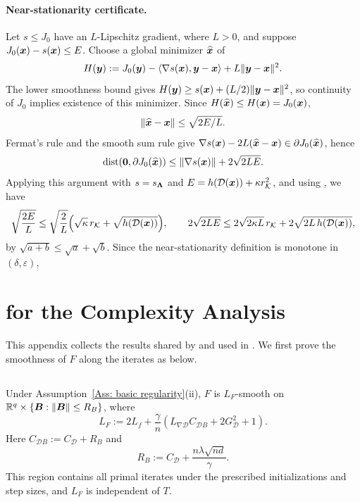 \paragraph{Near-stationarity certificate.}
Let $s\le J_0$ have an $L$-Lipschitz gradient, where $L>0$, and suppose $J_0(\bm{x})-s(\bm{x})\le E$. Choose a global minimizer $\widehat{\bm{x}}$ of
\[
H(\bm{y}):=J_0(\bm{y})-\langle\nabla s(\bm{x}),\bm{y}-\bm{x}\rangle+L\|\bm{y}-\bm{x}\|^2.
\]
The lower smoothness bound gives $H(\bm{y})\ge s(\bm{x})+(L/2)\|\bm{y}-\bm{x}\|^2$, so continuity of $J_0$ implies existence of this minimizer. Since $H(\widehat{\bm{x}})\le H(\bm{x})=J_0(\bm{x})$,
\[
\|\widehat{\bm{x}}-\bm{x}\|\le\sqrt{2E/L}.
\]
Fermat's rule and the smooth sum rule give
$\nabla s(\bm{x})-2L(\widehat{\bm{x}}-\bm{x})\in\partial J_0(\widehat{\bm{x}})$, hence
\[
\operatorname{dist}(\bm0,\partial J_0(\widehat{\bm{x}}))
\le\|\nabla s(\bm{x})\|+2\sqrt{2LE}.
\]
Applying this argument with $s=s_{\bm{\Lambda}}$ and $E=h(\mathcal{D}(\bm{x}))+\kappa r_{\mathcal{K}}^2$, and using , we have
\[
\sqrt{\frac{2E}{L}}\le\sqrt{\frac{2}{L}}\Bigl(\sqrt{\kappa}\,r_{\mathcal{K}}+\sqrt{h(\mathcal{D}(\bm{x}))}\Bigr),
\qquad
2\sqrt{2LE}\le 2\sqrt{2\kappa L}\,r_{\mathcal{K}}+2\sqrt{2L\,h(\mathcal{D}(\bm{x}))},
\]
by $\sqrt{a+b}\le\sqrt{a}+\sqrt{b}$. Since the near-stationarity definition is monotone in $(\delta,\varepsilon)$, 

\endgroup

\section{ for the Complexity Analysis}
\label{app:complexity-auxiliary-results}
This appendix collects the results shared by  and used in . 
We first prove the smoothness of $F$ along the iterates as below. 
\subsection{}
\label{app:smoothness-discussion}
\begingroup\color{blue}
Under Assumption~\ref{Ass: basic regularity}(ii), $F$ is $L_F$-smooth on $\mathbb{R}^q\times\{\bm{B}:\|\bm{B}\|\le R_B\}$, where
\begin{equation}
\label{eq:derived-smoothness-constant}
L_F:=2L_f+\frac{\gamma}{n}\left(L_{\nabla\mathcal{D}}C_{\mathcal{D}B}+2G_{\mathcal{D}}^2+1\right).
\end{equation}
Here $C_{\mathcal{D}B}:=C_{\mathcal{D}}+R_B$ and
\[
R_B:=C_{\mathcal{D}}+\frac{n\lambda\sqrt{nd}}{\gamma}.
\]
This region contains all primal iterates under the prescribed initializations and step sizes, and $L_F$ is independent of $T$.

